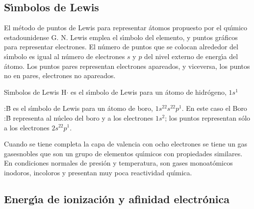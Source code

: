 \subsection{S\'{\i}mbolos de Lewis}
El m\'etodo de puntos de Lewis para representar \'atomos propuesto por el qu\'{\i}\-mi\-co estadounidense G. N. Lewis emplea el  s\'{\i}mbolo del elemento, y puntos gr\'a\-fi\-cos para representar electrones. El n\'umero de puntos que se colocan alrededor del s\'{\i}mbolo es igual al n\'umero de
electrones $s$ y $p$ del nivel externo de energ\'{\i}a del \'atomo. Los puntos pares representan electrones apareados, y viceversa, los puntos no en pares, electrones no apareados.
\newpage
\begin{ejemplo}{S\'{\i}mbolos de Lewis}
H$\cdot$ es el s\'{\i}mbolo de Lewis para un \'atomo de hidr\'ogeno, $1s^1$

 :\.B es el s\'{\i}mbolo de Lewis para un \'atomo de boro,
$1s^22s^22p^1$. En este caso el Boro  :\.B representa al n\'ucleo del
boro y a los electrones $1s^2$; los puntos representan s\'olo  a los
electrones $2s^22p^1$.
\end{ejemplo}

Cuando se tiene completa la capa de valencia con  ocho electrones se tiene un gas  \gls{gasesnobles} que son un grupo de elementos qu\'{\i}micos con propiedades  similares. En condiciones normales de presi\'on y temperatura, son gases monoat\'omicos inodoros, incoloros y presentan muy poca reactividad qu\'{\i}mica.

\subsection{Energ\'{\i}a de ionizaci\'on y afinidad electr\'onica}

